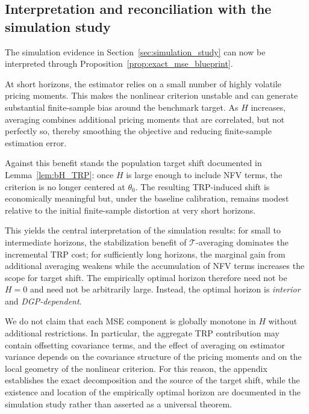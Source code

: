\subsection{Interpretation and reconciliation with the simulation study}
\label{sec:appendix_bv_interpretation}

The simulation evidence in Section~\ref{sec:simulation_study} can now be interpreted through Proposition~\ref{prop:exact_mse_blueprint}.

At short horizons, the estimator relies on a small number of highly volatile pricing moments.
This makes the nonlinear criterion unstable and can generate substantial finite-sample bias around the benchmark target.
As $H$ increases, averaging combines additional pricing moments that are correlated, but not perfectly so, thereby smoothing the objective and reducing finite-sample estimation error.

Against this benefit stands the population target shift documented in Lemma~\ref{lem:bH_TRP}:
once $H$ is large enough to include NFV terms, the criterion is no longer centered at $\theta_0$.
The resulting TRP-induced shift is economically meaningful but, under the baseline calibration, remains modest relative to the initial finite-sample distortion at very short horizons.

This yields the central interpretation of the simulation results:
for small to intermediate horizons, the stabilization benefit of $\mathcal{T}$-averaging dominates the incremental TRP cost;
for sufficiently long horizons, the marginal gain from additional averaging weakens while the accumulation of NFV terms increases the scope for target shift.
The empirically optimal horizon therefore need not be $H=0$ and need not be arbitrarily large.
Instead, the optimal horizon is \emph{interior} and \emph{DGP-dependent}.

\begin{remark}
	We do not claim that each MSE component is globally monotone in $H$ without additional restrictions.
	In particular, the aggregate TRP contribution may contain offsetting covariance terms, and the effect of averaging on estimator variance depends on the covariance structure of the pricing moments and on the local geometry of the nonlinear criterion.
	For this reason, the appendix establishes the exact decomposition and the source of the target shift, while the existence and location of the empirically optimal horizon are documented in the simulation study rather than asserted as a universal theorem.
\end{remark}

